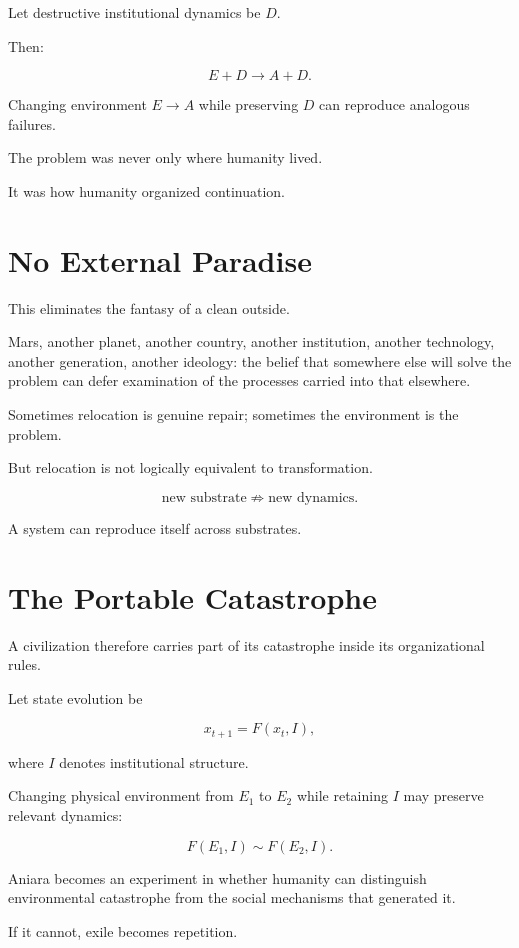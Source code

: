 \documentclass[11pt,oneside]{book}
\theoremstyle{definition}
\theoremstyle{remark}
\begin{document}
Let destructive institutional dynamics be \(D\).

Then:

\[
E+D
\rightarrow
A+D.
\]

Changing environment \(E\rightarrow A\) while preserving \(D\) can reproduce analogous failures.

The problem was never only where humanity lived.

It was how humanity organized continuation.

\section{No External Paradise}

This eliminates the fantasy of a clean outside.

Mars, another planet, another country, another institution, another technology, another generation, another ideology: the belief that somewhere else will solve the problem can defer examination of the processes carried into that elsewhere.

Sometimes relocation is genuine repair; sometimes the environment is the problem.

But relocation is not logically equivalent to transformation.

\[
\text{new substrate}
\not\Rightarrow
\text{new dynamics}.
\]

A system can reproduce itself across substrates.

\section{The Portable Catastrophe}

A civilization therefore carries part of its catastrophe inside its organizational rules.

Let state evolution be

\[
x_{t+1}=F(x_t,I),
\]

where \(I\) denotes institutional structure.

Changing physical environment from \(E_1\) to \(E_2\) while retaining \(I\) may preserve relevant dynamics:

\[
F(E_1,I)
\sim
F(E_2,I).
\]

Aniara becomes an experiment in whether humanity can distinguish environmental catastrophe from the social mechanisms that generated it.

If it cannot, exile becomes repetition.
\end{document}
